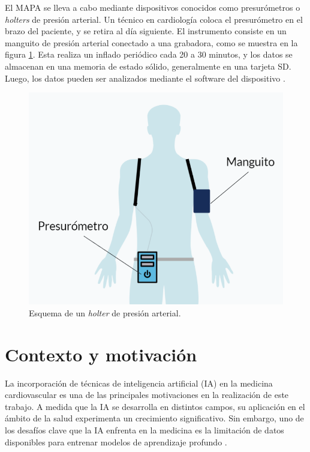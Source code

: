 
El MAPA se lleva a cabo mediante dispositivos conocidos como presurómetros o \textit{holters} de presión arterial. 
Un técnico en cardiología coloca el presurómetro en el brazo del paciente, y se retira al día siguiente. 
El instrumento consiste en un manguito de presión arterial conectado a una grabadora, como se muestra en 
la figura \ref{fig:holter}. Esta realiza un inflado periódico cada 20 a 30 minutos, y los datos se almacenan en una memoria 
de estado sólido, generalmente en una tarjeta SD. Luego, los datos pueden ser analizados mediante el software del 
dispositivo \citep{CITE:3} \citep{CITE:7}.

\begin{figure}[h!]
  \centering
  \includegraphics[width=.7\textwidth]{./Figures/presurometro.png}
  \caption{Esquema de un \textit{holter} de presión arterial.}
  \label{fig:holter}
\end{figure}


\newpage
\section{Contexto y motivación}

La incorporación de técnicas de inteligencia artificial (IA) en la medicina cardiovascular es una de las principales 
motivaciones en la realización de este trabajo. A medida que la IA se desarrolla en distintos campos, su aplicación 
en el ámbito de la salud experimenta un crecimiento significativo. Sin embargo, uno de los desafíos clave que la IA 
enfrenta en la medicina es la limitación de datos disponibles para entrenar modelos de aprendizaje profundo \citep{CITE:8}.


